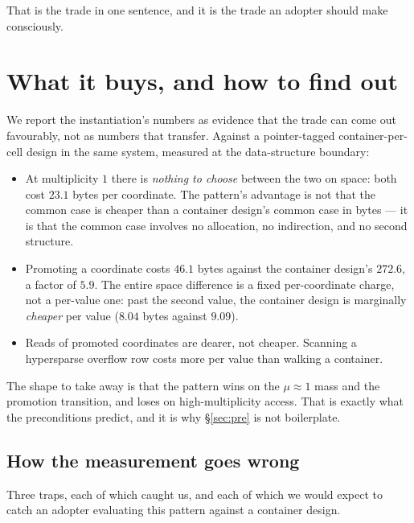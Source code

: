 \documentclass[11pt,a4paper]{article}
\theoremstyle{plain}
\theoremstyle{definition}
\theoremstyle{remark}
\begin{document}
That is the trade in one sentence, and it is the trade an adopter should make
consciously.

\section{What it buys, and how to find out}
\label{sec:measured}

We report the instantiation's numbers as evidence that the trade can come out
favourably, not as numbers that transfer. Against a pointer-tagged
container-per-cell design in the same system, measured at the data-structure
boundary:

\begin{itemize}
  \item At multiplicity $1$ there is \emph{nothing to choose} between the two
    on space: both cost $23.1$ bytes per coordinate. The pattern's advantage is
    not that the common case is cheaper than a container design's common case
    in bytes --- it is that the common case involves no allocation, no
    indirection, and no second structure.
  \item Promoting a coordinate costs $46.1$ bytes against the container
    design's $272.6$, a factor of $5.9$. The entire space difference is a fixed
    per-coordinate charge, not a per-value one: past the second value, the
    container design is marginally \emph{cheaper} per value ($8.04$ bytes
    against $9.09$).
  \item Reads of promoted coordinates are dearer, not cheaper. Scanning a
    hypersparse overflow row costs more per value than walking a container.
\end{itemize}

The shape to take away is that the pattern wins on the $\mu \approx 1$ mass and
the promotion transition, and loses on high-multiplicity access. That is
exactly what the preconditions predict, and it is why \S\ref{sec:pre} is not
boilerplate.

\subsection{How the measurement goes wrong}
\label{sec:measurement}

Three traps, each of which caught us, and each of which we would expect to
catch an adopter evaluating this pattern against a container design.
\end{document}
